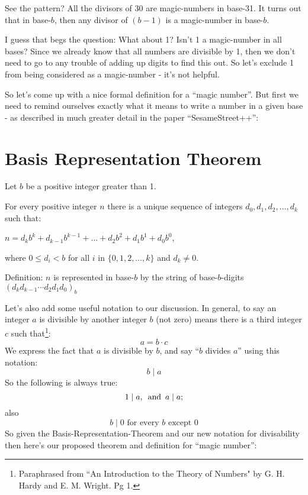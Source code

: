 \documentclass{article}
\newenvironment{jprIn}{\begin{adjustwidth}{2em}{}}{\end{adjustwidth}}
\begin{document}
See the pattern? All the divisors of 30 are magic-numbers in base-31.
It turns out that in base-$b$, then any divisor of $(b-1)$ is a magic-number in base-$b$.

I guess that begs the question: What about 1? Isn't 1 a magic-number in all bases?
Since we already know that all numbers are divisible by 1,
then we don't need to go to any trouble of adding up digits to find this out.
So let's exclude 1 from being considered as a magic-number - it's not helpful.

So let's come up with a nice formal definition for a ``magic number''.
But first we need to remind ourselves exactly
what it means to write a number in a given base - as described in
much greater detail in the paper ``SesameStreet++'':

\section*{Basis Representation Theorem}
\begin{jprIn}
Let $b$ be a positive integer greater than 1.

For every positive integer $n$ there is a unique sequence
of integers $d_0, d_1, d_2,\dots{},d_k$ such that:

\hspace{3em}$n=d_kb^k+d_{k-1}b^{k-1}+\dots+d_2b^2+d_1b^1+d_0b^0$,

where $0\le{}d_i<b$ for all $i$ in $\{0,1,2,\dots{},k\}$ and $d_k\ne0$.

Definition: $n$ is represented in base-$b$ by the string
of base-$b$-digits $(d_kd_{k-1}{\cdots}d_2d_1d_0)_b$
\end{jprIn}
\bigskip

Let's also add some useful notation to our discussion.
In general, to say an integer $a$ is divisible by another integer $b$
(not zero) means there is a third integer $c$ such that\footnote{Paraphrased
from ``An Introduction to the Theory of Numbers" by G. H. Hardy
and E. M. Wright. Pg 1.}:
\[a=b\cdot{}c\]
We express the fact that $a$ is divisible by $b$, and say
``$b$ divides $a$'' using this notation:
\[b\mid{}a\]
So the following is always true:
\[1\mid{}a,
\text{\hspace{0.5em}and\hspace{0.5em}}a\mid{}a;\]
also
\[b\mid{}0\text{ for every }b\text{ except }0\]
%
So given the Basis-Representation-Theorem and our new notation for divisability
then here's our
proposed theorem and definition for ``magic number'':
\end{document}
